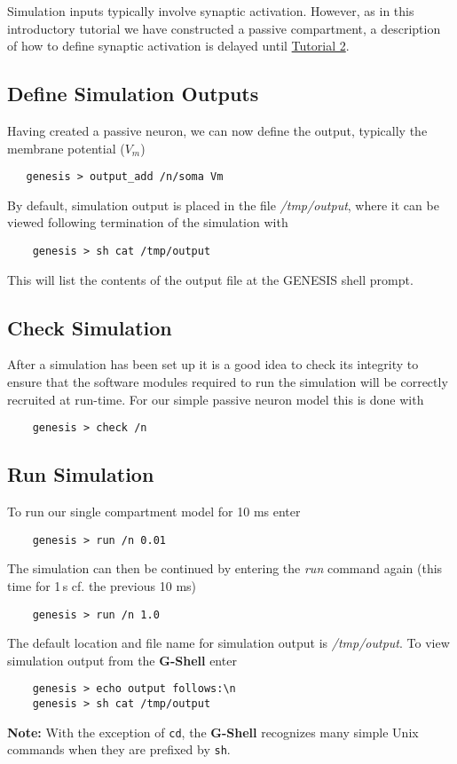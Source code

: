 \documentclass[12pt]{article}
\begin{document}
Simulation inputs typically involve synaptic activation. However, as in this introductory tutorial we have constructed a passive compartment, a description of how to define synaptic activation is delayed until \href{../tutorial2/tutorial2.tex}{Tutorial 2}.  

\subsection*{Define Simulation Outputs}

Having created a passive neuron, we can now define the output, typically the membrane potential ($V_m$)
\begin{verbatim}
   genesis > output_add /n/soma Vm
\end{verbatim}
By default, simulation output is placed in the file {\it /tmp/output}, where it can be viewed following termination of the simulation with
\begin{verbatim}
    genesis > sh cat /tmp/output
\end{verbatim}
This will list the contents of the output file at the GENESIS shell prompt.

\subsection*{Check Simulation}

After a simulation has been set up it is a good idea to check its integrity to ensure that the software modules required to run the simulation will be correctly recruited at run-time. For our simple passive neuron model this is done with 
\begin{verbatim}
    genesis > check /n
\end{verbatim}

\subsection*{Run Simulation}

To run our single compartment model for 10 ms enter
\begin{verbatim}
    genesis > run /n 0.01
\end{verbatim}
The simulation can then be continued by entering the {\it run} command again (this time for 1\,s cf. the previous 10 ms)
\begin{verbatim}
    genesis > run /n 1.0
\end{verbatim}
The default location and file name for simulation output is {\it /tmp/output}. To view simulation output from the {\bf G-Shell} enter
\begin{verbatim}
    genesis > echo output follows:\n
    genesis > sh cat /tmp/output
\end{verbatim}
{\bf Note:} With the exception of {\tt cd}, the {\bf G-Shell} recognizes many simple Unix commands when they are prefixed by {\tt sh}.
    
\end{document}
